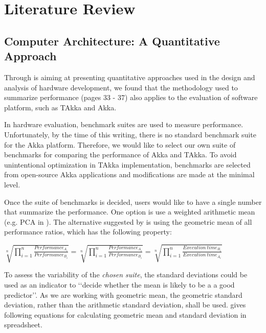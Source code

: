 \documentclass[12pt, a4paper, twoside]{article}
\begin{document}
\maketitle

\section{Literature Review}

\subsection{Computer Architecture: A Quantitative Approach\cite{HePa06}}

Through \cite{HePa06} is aiming at presenting quantitative approaches used in the design and analysis of hardware development, we found that the methodology used to summarize performance (pages 33 - 37) also applies to the evaluation of software platform, such as TAkka and Akka.

In hardware evaluation, benchmark suites are used to measure performance.  Unfortunately, by the time of this writing, there is no standard benchmark suite for the Akka platform.  Therefore, we would like to select our own suite of benchmarks for comparing the performance of Akka and TAkka.  To avoid unintentional optimization in TAkka implementation, benchmarks are selected from open-source Akka applications and modifications are made at the minimal level.

Once the suite of benchmarks is decided, users would like to have a single number that summarize the performance.  One option is use a weighted arithmetic mean (e.g. PCA in \cite{Blackburn2006} ).  The alternative suggested by \cite{HePa06} is using the geometric mean of all performance ratios, which has the following property:

  $ \sqrt[n]{\prod^{n}_{i=1}\frac{Performance_{A_i}}{Performance_{B_i}}} = \sqrt[n]{\prod^{n}_{i=1}\frac{Performance_{A_i}}{Performance_{B_i}}} = \sqrt[n]{\prod^{n}_{i=1}\frac{Execution\ time_{B_i}}{Execution\ time_{A_i}}} $

To assess the variability of the \emph{chosen suite}, the standard deviations could be used as an indicator to \lq\lq{}decide whether the mean is likely to be a a good predictor\rq\rq{}.   As we are working with geometric mean, the geometric standard deviation, rather than the arithmetic standard deviation, shall be used.  \cite{HePa06} gives following equations for calculating geometric mean and standard deviation in spreadsheet.
\end{document}
